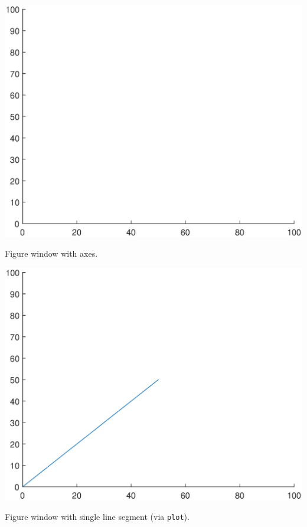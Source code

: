 \documentclass{tufte-book} %
\begin{document}
\begin{marginfigure}[0.0in]
\includegraphics[width=\linewidth]{ch3-graphics01.eps}
\caption{Figure window with axes.}
\label{fig:ch3-graphics01}
\end{marginfigure}

\begin{marginfigure}[-0.0in]
\includegraphics[width=\linewidth]{ch3-graphics02.eps}
\caption{Figure window with single line segment (via \texttt{plot}).}
\label{fig:ch3-graphics02}
\end{marginfigure}
\end{document}

